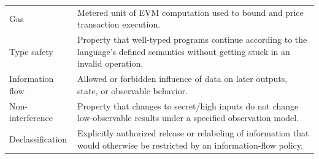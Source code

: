 \documentclass[11pt,a4paper]{article}
\numberwithin{figure}{section}
\begin{document}
\begin{longtable}{@{}>{\raggedright\arraybackslash}p{34mm}>{\raggedright\arraybackslash}p{115mm}@{}}
Gas & Metered unit of EVM computation used to bound and price transaction execution.\\
Type safety & Property that well-typed programs continue according to the language's defined semantics without getting stuck in an invalid operation.\\
Information flow & Allowed or forbidden influence of data on later outputs, state, or observable behavior.\\
Non-interference & Property that changes to secret/high inputs do not change low-observable results under a specified observation model.\\
Declassification & Explicitly authorized release or relabeling of information that would otherwise be restricted by an information-flow policy.\\\bottomrule
\end{longtable}
\end{document}
